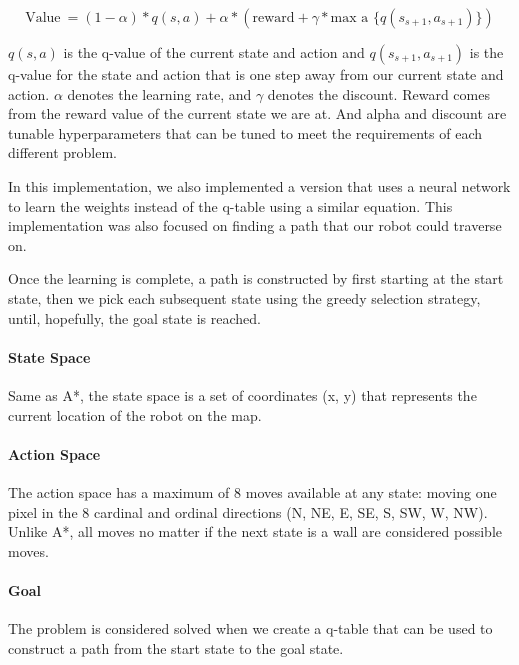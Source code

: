 \documentclass[11pt]{article}
\begin{document}
        \[ \text{Value}\ = (1- \alpha)*q(s,a) + \alpha * (\text{reward} + \gamma
        *\text{max a \{ } q(s_{s+1},a_{s+1}) \})  \]



        \( q(s,a)\) is the q-value of the current state and action and \(
        q(s_{s+1},a_{s+1})\) is the q-value for the state and action that is one
        step away from our current state and action. \(\alpha\) denotes the
        learning rate, and \(\gamma\) denotes the discount. Reward comes from
        the reward value of the current state we are at. And alpha and discount
        are tunable hyperparameters that can be tuned to meet the requirements
        of each different problem. 

        In this implementation, we also implemented a version that uses a neural network to learn the weights instead of the q-table using a similar equation. This implementation was also focused on finding a path that our robot could traverse on. 

        Once the learning is complete, a path is constructed by first starting
        at the start state, then we pick each subsequent state using the greedy
        selection strategy, until, hopefully, the goal state is reached. 

            \paragraph{State Space} 
            Same as A*, the state space is a set of coordinates (x, y) that represents the current location of the robot on the map. 

            \paragraph{Action Space}
            The action space has a maximum of 8 moves available at any state: moving
            one pixel in the 8 cardinal and ordinal directions (N, NE, E, SE, S, SW,
            W, NW). Unlike A*, all moves no matter if the next state is a wall are
            considered possible moves. 

            \paragraph{Goal}
            The problem is considered solved when we create a q-table that can be used to construct a path from the start state to the goal state. 
\end{document}

